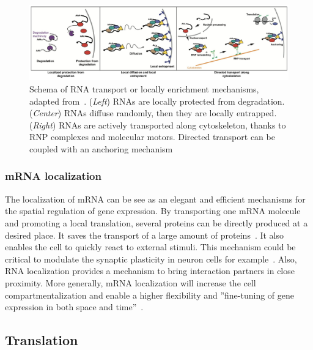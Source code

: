 \begin{figure}[]
    \centering
    \includegraphics[width=\textwidth]{figures/introduction/rna_transport}
    \caption[Schema of RNA transport or locally enrichment mechanisms]{Schema of RNA transport or locally enrichment mechanisms, adapted from~\cite{Medioni_2012}.
	(\textit{Left}) RNAs are locally protected from degradation.
	(\textit{Center}) RNAs diffuse randomly, then they are locally entrapped.
	(\textit{Right}) RNAs are actively transported along cytoskeleton, thanks to RNP complexes and molecular motors.
	Directed transport can be coupled with an anchoring mechanism}
    \label{fig:rna_transport}
\end{figure}

\subsubsection{mRNA localization}

The localization of \ac{mRNA} can be see as an elegant and efficient mechanisms for the spatial regulation of gene expression.
By transporting one \ac{mRNA} molecule and promoting a local translation, several proteins can be directly produced at a desired place.
It saves the transport of a large amount of proteins~\cite{Medioni_2012}.
It also enables the cell to quickly react to external stimuli.
This mechanism could be critical to modulate the synaptic plasticity in neuron cells for example~\cite{jung_axonal_2012}.
Also, \ac{RNA} localization provides a mechanism to bring interaction partners in close proximity. 
More generally, \ac{mRNA} localization will increase the cell compartmentalization and enable a higher flexibility and ''fine-tuning of gene expression in both space and time''~\cite{Medioni_2012}.


\subsection{Translation}
\label{subsec:intro_translation}

